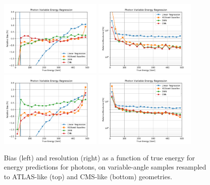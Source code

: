 \begin{figure}[htbp]
\centering
\includegraphics[width=0.45\textwidth]{Images/Calo/bias_vs_E_Gamma_variable_ATLAS.pdf}
\includegraphics[width=0.45\textwidth]{Images/Calo/res_vs_E_Gamma_variable_ATLAS.pdf} \\
\includegraphics[width=0.45\textwidth]{Images/Calo/bias_vs_E_Gamma_variable_CMS.pdf}
\includegraphics[width=0.45\textwidth]{Images/Calo/res_vs_E_Gamma_variable_CMS.pdf}
\caption{Bias (left) and resolution (right) as a function of true energy for energy predictions for photons, on variable-angle samples resampled to ATLAS-like (top) and CMS-like (bottom) geometries. \label{fig:reg_resampled_gamma_ATLAS_CMS}}
\end{figure}


